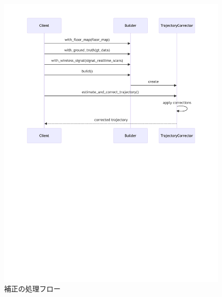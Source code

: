 \begin{figure}[H]
    \centering
    \includegraphics[width=\linewidth]{../image/corrector-flow-diagram.pdf}
    \caption{補正の処理フロー}
    \label{fig:corrector-sequence}
\end{figure}
